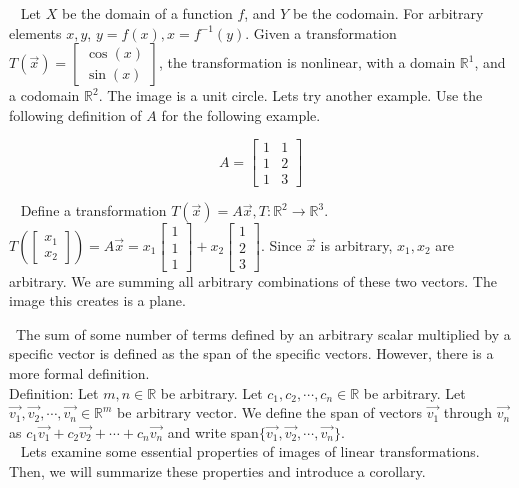 \documentclass[12pt]{article}
\begin{document}
\setlength{\leftskip}{0in}
$\,\,\,$ Let $X$ be the domain of a function $f$, and $Y$ be the codomain. For arbitrary elements $x,y$, $y=f(x),x=f^{-1}(y)$. Given a transformation $T(\vec{x})=\begin{bmatrix}\cos(x)\\\sin(x)\end{bmatrix}$, the transformation is nonlinear, with a domain $\mathbb{R}^1$, and a codomain $\mathbb{R}^2$. The image is a unit circle. Lets try another example. Use the following definition of $A$ for the following example.

$$A=\begin{bmatrix}
1 & 1\\1 & 2\\1 & 3
\end{bmatrix}$$

$\,\,\,$ Define a transformation $T(\vec{x})=A\vec{x},T:\mathbb{R}^2\rightarrow\mathbb{R}^3$. $T\left(\begin{bmatrix}x_1\\x_2\end{bmatrix}\right)=A\vec{x}=x_1\begin{bmatrix}1\\1\\1\end{bmatrix}+x_2\begin{bmatrix}1\\2\\3\end{bmatrix}$. Since $\vec{x}$ is arbitrary, $x_1,x_2$ are arbitrary. We are summing all arbitrary combinations of these two vectors. The image this creates is a plane.

$\,\,\,$The sum of some number of terms defined by an arbitrary scalar multiplied by a specific vector is defined as the span of the specific vectors. However, there is a more formal definition.\\

Definition: Let $m,n\in\mathbb{R}$ be arbitrary. Let $c_1,c_2,\cdots,c_n\in\mathbb{R}$ be arbitrary. Let $\vec{v_1},\vec{v_2},\cdots,\vec{v_n}\in\mathbb{R}^m$ be arbitrary vector. We define the span of vectors $\vec{v_1}$ through $\vec{v_n}$ as $c_1\vec{v_1}+c_2\vec{v_2}+\cdots+c_n\vec{v_n}$ and write span$\lbrace\vec{v_1},\vec{v_2},\cdots,\vec{v_n}\rbrace$.\\

$\,\,\,$ Lets examine some essential properties of images of linear transformations. Then, we will summarize these properties and introduce a corollary.\\
\end{document}
